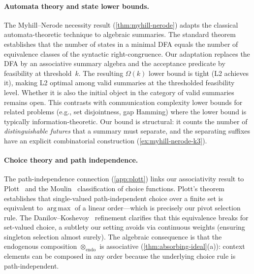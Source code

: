 \documentclass[11pt]{article}
\theoremstyle{plain}
\theoremstyle{definition}
\theoremstyle{remark}
\newcommand{\opendo}{\otimes_{\mathrm{endo}}}
\DeclareMathOperator*{\argmax}{arg\,max}
\begin{document}
\paragraph{Automata theory and state lower bounds.}
The Myhill--Nerode necessity result (\cref{thm:myhill-nerode}) adapts
the classical automata-theoretic technique
\cite{hopcroft1979introduction} to algebraic summaries.  The standard
theorem establishes that the number of states in a minimal DFA equals
the number of equivalence classes of the syntactic right-congruence.
Our adaptation replaces the DFA by an associative summary algebra and
the acceptance predicate by feasibility at threshold~$k$.  The
resulting $\Omega(k)$ lower bound is tight (L2 achieves it), making L2
optimal among valid summaries at the thresholded feasibility level.
Whether it is also the initial object in the category of valid
summaries remains open.
This contrasts with communication complexity lower bounds for
related problems (e.g., set disjointness, gap Hamming) where the lower
bound is typically information-theoretic.  Our bound is structural: it
counts the number of \emph{distinguishable futures} that a summary must
separate, and the separating suffixes have an explicit combinatorial
construction (\cref{ex:myhill-nerode-k3}).

\paragraph{Choice theory and path independence.}
The path-independence connection (\cref{app:plott}) links our
associativity result to Plott~\cite{plott1973path} and the
Moulin~\cite{moulin1985choice} classification of choice functions.
Plott's theorem establishes that single-valued path-independent choice
over a finite set is equivalent to $\argmax$ of a linear order---which
is precisely our pivot selection rule.  The
Danilov--Koshevoy~\cite{danilov2003choice} refinement clarifies
that this equivalence breaks for set-valued choice, a subtlety our
setting avoids via continuous weights (ensuring singleton selection
almost surely).  The algebraic consequence is that the endogenous
composition $\opendo$ is associative (\cref{thm:absorbing-ideal}(a)):
context elements can be composed in any order because the underlying
choice rule is path-independent.
\end{document}
